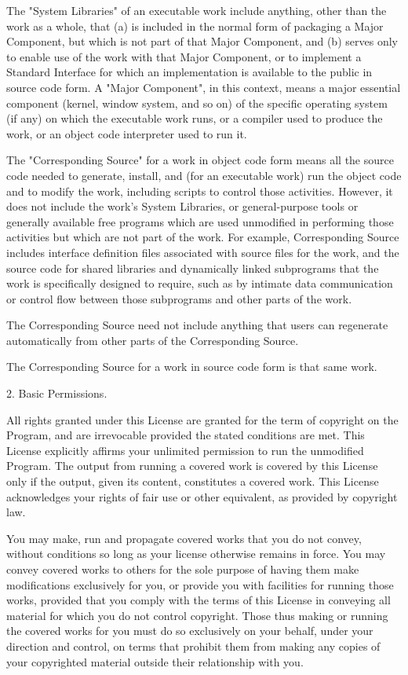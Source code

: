 \documentclass[parskip=half]{scrartcl}
\begin{document}
  The "System Libraries" of an executable work include anything, other
than the work as a whole, that (a) is included in the normal form of
packaging a Major Component, but which is not part of that Major
Component, and (b) serves only to enable use of the work with that
Major Component, or to implement a Standard Interface for which an
implementation is available to the public in source code form.  A
"Major Component", in this context, means a major essential component
(kernel, window system, and so on) of the specific operating system
(if any) on which the executable work runs, or a compiler used to
produce the work, or an object code interpreter used to run it.

  The "Corresponding Source" for a work in object code form means all
the source code needed to generate, install, and (for an executable
work) run the object code and to modify the work, including scripts to
control those activities.  However, it does not include the work's
System Libraries, or general-purpose tools or generally available free
programs which are used unmodified in performing those activities but
which are not part of the work.  For example, Corresponding Source
includes interface definition files associated with source files for
the work, and the source code for shared libraries and dynamically
linked subprograms that the work is specifically designed to require,
such as by intimate data communication or control flow between those
subprograms and other parts of the work.

  The Corresponding Source need not include anything that users
can regenerate automatically from other parts of the Corresponding
Source.

  The Corresponding Source for a work in source code form is that
same work.

  2. Basic Permissions.

  All rights granted under this License are granted for the term of
copyright on the Program, and are irrevocable provided the stated
conditions are met.  This License explicitly affirms your unlimited
permission to run the unmodified Program.  The output from running a
covered work is covered by this License only if the output, given its
content, constitutes a covered work.  This License acknowledges your
rights of fair use or other equivalent, as provided by copyright law.

  You may make, run and propagate covered works that you do not
convey, without conditions so long as your license otherwise remains
in force.  You may convey covered works to others for the sole purpose
of having them make modifications exclusively for you, or provide you
with facilities for running those works, provided that you comply with
the terms of this License in conveying all material for which you do
not control copyright.  Those thus making or running the covered works
for you must do so exclusively on your behalf, under your direction
and control, on terms that prohibit them from making any copies of
your copyrighted material outside their relationship with you.
\end{document}
